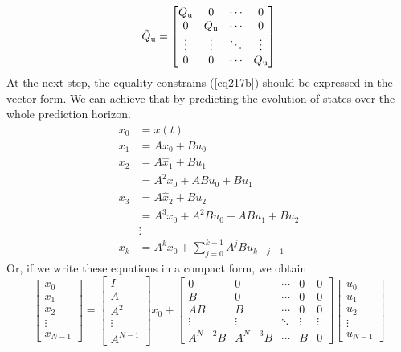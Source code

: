 \begin{equation}
\tilde{Q} _{\text{u}} = \begin{bmatrix}
Q _{\text{u}}&0&\cdots&0\\
0&Q _{\text{u}}&\cdots&0\\
\vdots&\vdots&\ddots&\vdots\\
0&0&\cdots&Q _{\text{u}}
\end{bmatrix}
\end{equation}
At the next step, the equality constrains (\ref{eq217b}) should be expressed in the vector form. We can achieve that by predicting the evolution of states over the whole prediction horizon.
\begin{equation}
\begin{split}
x_0 &= x(t)\\
x_{1} &= Ax_0 + Bu_0\\
x_{2} &= A\hat{x}_{1} + Bu_{1}\\
&= A^2x_0 + ABu_0 + Bu_{1}\\
x_{3} &= A\hat{x}_{2} + Bu_{2}\\
&= A^3x_0 + A^2Bu_0 + ABu_{1} + Bu_{2}\\
&\vdots\\
x_{k} &= A^kx_0+\sum_{j=0}^{k-1}A^jBu_{k-j-1}
\end{split}
\end{equation}
Or, if we write these equations in a compact form, we obtain
\begin{equation}
	\begin{bmatrix}
	x_0\\x_{1}\\ x_{2}\\\vdots\\ x_{N-1}
	\end{bmatrix} = 
	\begin{bmatrix}I\\A\\A^2\\ \vdots \\ A^{N-1}\end{bmatrix}x_0 + 
	\begin{bmatrix}
	0& 0&\cdots&0&0\\
	B&0&\cdots&0&0\\
	AB&B&\cdots&0&0\\
	\vdots&\vdots&\ddots&\vdots&\vdots\\
	A^{N-2}B&A^{N-3}B&\cdots&B&0\end{bmatrix}
	\begin{bmatrix}u_0\\u_{1}\\u_{2}\\\vdots\\u_{N-1}\end{bmatrix}
\end{equation}
